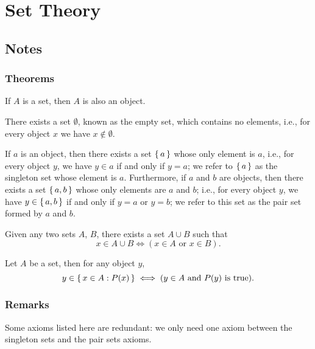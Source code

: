 \section{Set Theory}
\subsection{Notes}
\subsubsection{Theorems}
\begin{axiom}
    If $A$ is a set, then $A$ is also an object.
\end{axiom}
\begin{axiom}
    There exists a set $\emptyset$, known as the empty set, which contains no elements, i.e., for every object $x$ we have $x \notin \emptyset$.
\end{axiom}
\begin{axiom}
    If $a$ is an object, then there exists a set $\set{a}$ whose only element is $a$, i.e., for every object $y$, we have $y\in{a}$ if and only if $y=a$; we refer to $\set{a}$ as the singleton set whose element is $a$. Furthermore, if $a$ and $b$ are objects, then there exists a set $\set{a, b}$ whose only elements are $a$ and $b$; i.e., for every object $y$, we have $y \in \set{a, b}$ if and only if $y = a$ or $y = b$; we refer to this set as the pair set formed by $a$ and $b$.
\end{axiom}
\begin{axiom}
    Given any two sets $A$, $B$, there exists a set $A \cup B$ such that \[x\in A\cup B \iff (x\in A \text{ or } x\in B).\]
\end{axiom}
\begin{axiom}
    Let $A$ be a set, then for any object $y$, \[y\in \set{x\in A: P(x)} \iff (y\in A \text{ and } P(y) \text{ is true}).\] 
\end{axiom}

\subsubsection{Remarks}
Some axioms listed here are redundant: we only need one axiom between the singleton sets and the pair sets axioms.


